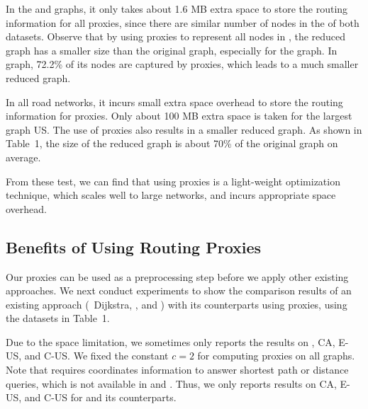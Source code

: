 In the \dblp and \dblpone graphs, it only takes about 1.6 MB extra space to store the routing information for all proxies, since there are similar number of nodes in the \dras of both datasets. Observe that by using proxies to represent all nodes in \dras, the reduced graph  has a smaller size than the original graph, especially for the \dblpone graph. In \dblpone graph, 72.2\% of its nodes are captured by proxies, which leads to a much smaller reduced graph.

In all road networks, it incurs small extra space overhead to store the routing information for proxies. Only about 100 MB extra space is taken for the largest graph US. The use of proxies also results in a smaller reduced graph. As shown in Table~1, the size of the reduced graph is about 70\% of the original graph on average.



From these test, we can find that using proxies is a light-weight optimization technique, which scales well to large networks, and incurs appropriate space overhead. %

\subsection{Benefits of Using Routing Proxies}
Our proxies can be used as a preprocessing step before we apply other existing approaches. 
We next conduct experiments to show the comparison results of an existing approach (\ie \ Dijkstra, \arcflag, \tnr and \ah) with its counterparts using proxies, using the datasets in Table~1.



Due to the space limitation, we sometimes only reports the results on \dblpone, CA, E-US, and C-US. 
We fixed the constant $c = 2$ for computing proxies on all graphs. Note that \ah requires coordinates information to answer shortest path or distance queries, which is not available in \dblp and \dblpone. Thus, we only reports results on CA, E-US, and C-US for \ah and its counterparts.




